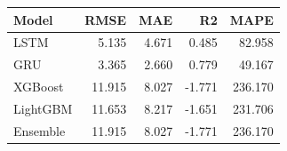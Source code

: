 \begin{tabular}{lrrrr}
\toprule
Model & RMSE & MAE & R2 & MAPE \\
\midrule
LSTM & 5.135 & 4.671 & 0.485 & 82.958 \\
GRU & 3.365 & 2.660 & 0.779 & 49.167 \\
XGBoost & 11.915 & 8.027 & -1.771 & 236.170 \\
LightGBM & 11.653 & 8.217 & -1.651 & 231.706 \\
Ensemble & 11.915 & 8.027 & -1.771 & 236.170 \\
\bottomrule
\end{tabular}

